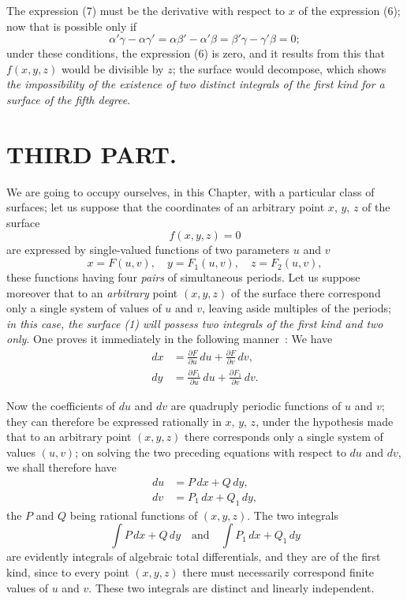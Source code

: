 \documentclass{article}
\begin{document}
The expression (7) must be the derivative with respect to $x$ of the expression (6); now that is possible only if
\[
\alpha'\gamma - \alpha\gamma' = \alpha\beta' - \alpha'\beta = \beta'\gamma - \gamma'\beta = 0;
\]
under these conditions, the expression (6) is zero, and it results from this that $f(x, y, z)$ would be divisible by $z$; the surface would decompose, which shows \emph{the impossibility of the existence of two distinct integrals of the first kind for a surface of the fifth degree}.

\section*{THIRD PART.}

We are going to occupy ourselves, in this Chapter, with a particular class of surfaces; let us suppose that the coordinates of an arbitrary point $x$, $y$, $z$ of the surface
\[
f(x, y, z) = 0
\tag{1}
\]
are expressed by single-valued functions of two parameters $u$ and $v$
\[
x = F(u, v), \quad y = F_{1}(u, v), \quad z = F_{2}(u, v),
\]
these functions having four \emph{pairs} of simultaneous periods. Let us suppose moreover that to an \emph{arbitrary} point $(x, y, z)$ of the surface there correspond only a single system of values of $u$ and $v$, leaving aside multiples of the periods; \emph{in this case, the surface (1) will possess two integrals of the first kind and two only}. One proves it immediately in the following manner~:
We have
\[
\begin{aligned}
dx &= \frac{\partial F}{\partial u}\,du + \frac{\partial F}{\partial v}\,dv, \\
dy &= \frac{\partial F_{1}}{\partial u}\,du + \frac{\partial F_{1}}{\partial v}\,dv.
\end{aligned}
\]

Now the coefficients of $du$ and $dv$ are quadruply periodic functions of $u$ and $v$; they can therefore be expressed rationally in $x$, $y$, $z$, under the hypothesis made that to an arbitrary point $(x, y, z)$ there corresponds only a single system of values $(u, v)$; on solving the two preceding equations with respect to $du$ and $dv$, we shall therefore have
\[
\begin{aligned}
du &= P\,dx + Q\,dy, \\
dv &= P_{1}\,dx + Q_{1}\,dy,
\end{aligned}
\]
the $P$ and $Q$ being rational functions of $(x, y, z)$. The two integrals
\[
\int P\,dx + Q\,dy \quad \text{and} \quad \int P_{1}\,dx + Q_{1}\,dy
\]
are evidently integrals of algebraic total differentials, and they are of the first kind, since to every point $(x, y, z)$ there must necessarily correspond finite values of $u$ and $v$. These two integrals are distinct and linearly independent.
\end{document}
